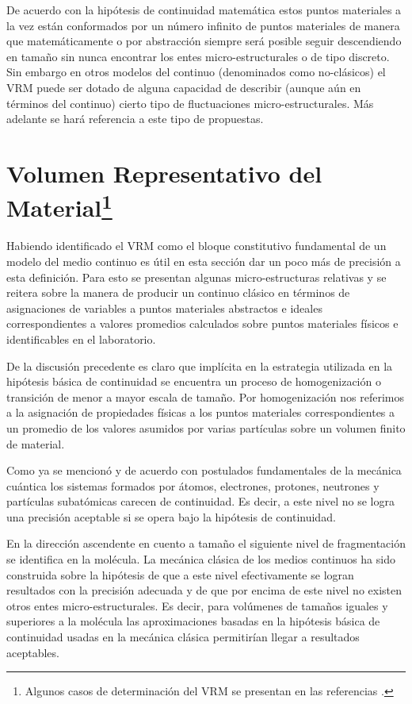 \documentclass[../notas medios.tex]{subfiles}
\begin{document}
De acuerdo con la hipótesis de continuidad matemática estos puntos materiales a la vez están conformados por un número infinito de puntos materiales de manera que matemáticamente o por abstracción siempre será posible seguir descendiendo en tamaño sin nunca encontrar los entes micro-estructurales o de tipo discreto.  Sin embargo en otros modelos del continuo (denominados como no-clásicos) el VRM puede ser dotado de alguna capacidad de describir (aunque aún en términos del continuo) cierto tipo de fluctuaciones micro-estructurales.  Más adelante se hará referencia a este tipo de propuestas.

\section*{Volumen Representativo del Material\footnote{Algunos casos de 
determinación del VRM se presentan en las referencias 
\cite{bonda1996effect,bonda1992deformation}.}}


Habiendo identificado el VRM como el bloque constitutivo fundamental de un
modelo del medio continuo es útil en esta sección dar un poco más de precisión
a esta definición.  Para esto se presentan algunas micro-estructuras relativas y se reitera sobre la manera de producir un continuo clásico en términos de asignaciones de variables a puntos materiales abstractos e ideales correspondientes a valores promedios calculados sobre puntos materiales físicos e identificables en el laboratorio.

De la discusión precedente es claro que implícita en la estrategia utilizada en la hipótesis básica de continuidad se encuentra un proceso de homogenización o transición de menor a mayor escala de tamaño.  Por homogenización nos referimos a la asignación de propiedades físicas a los puntos materiales correspondientes a un promedio de los valores asumidos por varias partículas sobre un volumen finito de material.

Como ya se mencionó y de acuerdo con postulados fundamentales de la mecánica cuántica los sistemas formados por átomos, electrones, protones, neutrones y partículas subatómicas carecen de continuidad.  Es decir, a este nivel no se logra una precisión aceptable si se opera bajo la hipótesis de continuidad.

En la dirección ascendente en cuento a tamaño el siguiente nivel de fragmentación se identifica en la molécula.  La mecánica clásica de los medios continuos ha sido construida sobre la hipótesis de que a este nivel efectivamente se logran resultados con la precisión adecuada y de que por encima de este nivel no existen otros entes micro-estructurales.  Es decir, para volúmenes de tamaños iguales y superiores a la molécula las aproximaciones basadas en la hipótesis básica de continuidad usadas en la mecánica clásica permitirían llegar a resultados aceptables.
\end{document}
